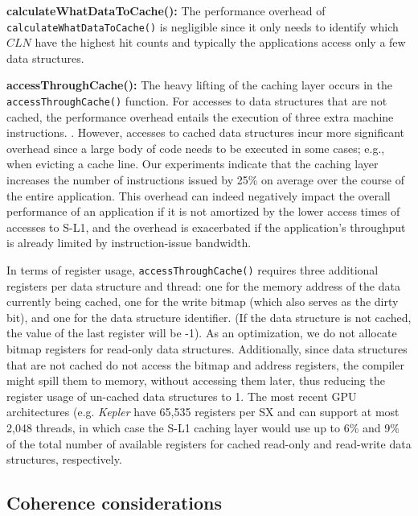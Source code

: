 \noindent
{\bf calculateWhatDataToCache():} 
The performance overhead of \texttt{calculateWhatDataToCache()} is
negligible since it only needs to identify which $CLN$ have the highest hit counts
and typically the applications access only a few data structures.

\noindent
{\bf accessThroughCache():} 
The heavy lifting of the caching layer occurs in the \texttt{accessThroughCache()} function. 
For accesses to data structures that are not cached, the performance overhead entails
the execution of three extra machine instructions.
. 
However, accesses to cached data structures incur more significant overhead since a large body of code needs to be executed in some cases; e.g., when evicting a cache line.
Our experiments indicate that the caching layer increases the number of instructions issued by 25\% on average over the course of the entire application.
This overhead can indeed negatively impact the overall performance of an application if it is not amortized by the lower access times of accesses to S-L1, and the overhead is exacerbated if the application's throughput is already limited by instruction-issue bandwidth.

In terms of register usage, \texttt{accessThroughCache()} requires three additional registers per data structure and thread: one for the memory address of the data currently being cached, one for the write bitmap (which also serves as the dirty bit), and one for the data structure identifier.
(If the data structure is not cached, the value of the last register will be -1). 
As an optimization, we do not allocate bitmap registers for read-only data structures. Additionally, since data structures that are not cached do not access the bitmap and address registers, the compiler might spill them to memory, without accessing them later, thus reducing the register usage of un-cached data structures to 1.
The most recent GPU architectures (e.g. {\it Kepler} have 65,535 registers per SX and can support at most 2,048 threads, in which case the S-L1 caching layer would use up to 6\% and 9\% of the total number of available registers for cached read-only and read-write data structures, respectively. 


\subsection{Coherence considerations}


